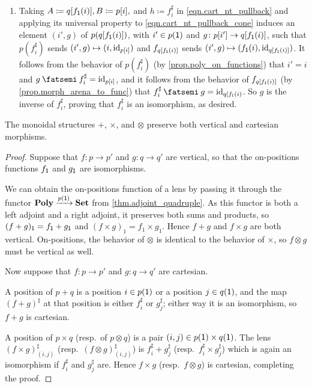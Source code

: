 \documentclass[Book-Poly]{subfiles}
\begin{document}
\begin{exercise}
\begin{solution}
\begin{enumerate}[resume]
    \item Taking $A\coloneqq q[f_{\textsf{1}}(i)], B\coloneqq p[i],$ and $h\coloneqq f^\sharp_i$ in \eqref{eqn.cart_nt_pullback} and applying its universal property to \eqref{eqn.cart_nt_pullback_cone} induces an element $(i',g)$ of $p(q[f_{\textsf{1}}(i)])$, with $i'\in p(\textsf{1})$ and $g\colon p[i']\to q[f_{\textsf{1}}(i)]$, such that $p(f^\sharp_i)$ sends $(i',g)\mapsto(i,\mathrm{id}_{p[i]})$ and $f_{q[f_{\textsf{1}}(i)]}$ sends $(i',g)\mapsto(f_{\textsf{1}}(i),\mathrm{id}_{q[f_{\textsf{1}}(i)]})$.
    It follows from the behavior of $p(f^\sharp_i)$ (by \cref{prop.poly_on_functions}) that $i'=i$ and $g\then f^\sharp_i=\id_{p[i]}$, and it follows from the behavior of $f_{q[f_{\textsf{1}}(i)]}$ (by \cref{prop.morph_arena_to_func}) that $f^\sharp_i\then g=\id_{q[f_\1(i)}$.
    So $g$ is the inverse of $f^\sharp_i$, proving that $f^\sharp_i$ is an isomorphism, as desired.
\end{enumerate}
\end{solution}
\end{exercise}

\begin{proposition}\label{prop.monoidal_pres_vert_cart}
The monoidal structures $+$, $\times$, and $\otimes$ preserve both vertical and cartesian morphisms.
\end{proposition}
\begin{proof}
Suppose that $f\colon p\to p'$ and $g\colon q\to q'$ are vertical, so that the on-positions functions $f_{\textsf{1}}$ and $g_{\textsf{1}}$ are isomorphisms.

We can obtain the on-positions function of a lens by passing it through the functor $\mathbf{Poly}\xrightarrow{p(\textsf{1})}\mathbf{Set}$ from \cref{thm.adjoint_quadruple}.
As this functor is both a left adjoint and a right adjoint, it preserves both sums and products, so $(f+g)_{\textsf{1}} = f_{\textsf{1}}+g_{\textsf{1}}$ and $(f\times g)_1 = f_1\times g_1$.
Hence $f+g$ and $f\times g$ are both vertical.
On-positions, the behavior of $\otimes$ is identical to the behavior of $\times$, so $f\otimes g$ must be vertical as well.

Now suppose that $f\colon p\to p'$ and $g\colon q\to q'$ are cartesian.

A position of $p+q$ is a position $i\in p(\textsf{1})$ or a position $j\in q(\textsf{1})$, and the map $(f+g)^\sharp$ at that position is either $f^\sharp_i$ or $g^\sharp_j$; either way it is an isomorphism, so $f+g$ is cartesian.

A position of $p\times q$ (resp.\ of $p\otimes q$) is a pair $(i,j)\in p(\textsf{1})\times q(\textsf{1})$. The lens $(f\times g)^\sharp_{(i,j)}$ (resp.\ $(f\otimes g)^\sharp_{(i,j)}$) is $f^\sharp_i+g^\sharp_j$ (resp.\ $f^\sharp_i\times g^\sharp_j$) which is again an isomorphism if $f^\sharp_i$ and $g^\sharp_j$ are. Hence $f\times g$ (resp.\ $f\otimes g$) is cartesian, completing the proof.
\end{proof}
\end{document}
